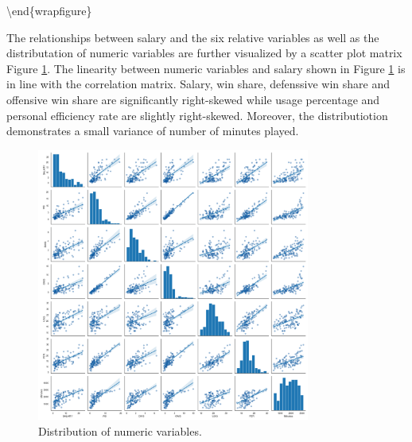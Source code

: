 \documentclass[letterpaper,12pt,twoside,]{pinp}
\begin{document}
\textbackslash{}end\{wrapfigure\}

The relationships between salary and the six relative variables as well
as the distributation of numeric variables are further visualized by a
scatter plot matrix Figure \ref{fig:scatter}. The linearity between
numeric variables and salary shown in Figure \ref{fig:scatter} is in
line with the correlation matrix. Salary, win share, defenssive win
share and offensive win share are significantly right-skewed while usage
percentage and personal efficiency rate are slightly right-skewed.
Moreover, the distributiotion demonstrates a small variance of number of
minutes played.

\begin{figure}[H]
\includegraphics[width=0.8\textwidth]{scatter.png}
\centering
\caption{Distribution of numeric variables.}
\label{fig:scatter}
\end{figure}
\end{document}
